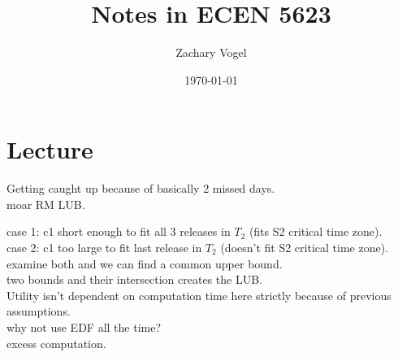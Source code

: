 \documentclass{article}
\author{Zachary Vogel}
\date{\today}
\title{Notes in ECEN 5623}
\begin{document}
\maketitle


\section*{Lecture}
Getting caught up because of basically 2 missed days.\\


moar RM LUB.

case 1: c1 short enough to fit all 3 releases in $T_2$ (fits S2 critical time zone).\\
case 2: c1 too large to fit last release in $T_2$ (doesn't fit S2 critical time zone).\\
examine both and we can find a common upper bound.\\

two bounds and their intersection creates the LUB.\\
Utility isn't dependent on computation time here strictly because of previous assumptions.\\

why not use EDF all the time?\\
excess computation.\\
\end{document}
